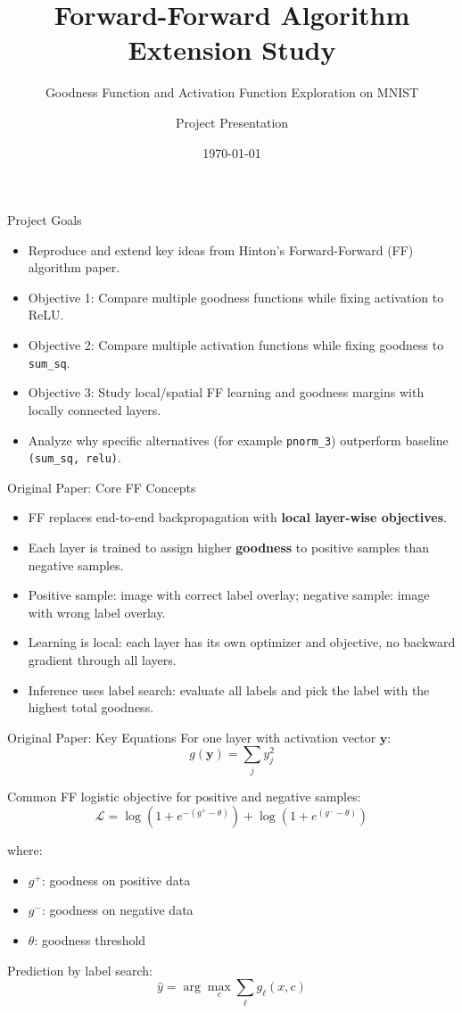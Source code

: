 \documentclass[aspectratio=169]{beamer}
\title{Forward-Forward Algorithm Extension Study}
\subtitle{Goodness Function and Activation Function Exploration on MNIST}
\author{Project Presentation}
\date{\today}
\begin{document}
\begin{frame}
  \titlepage
\end{frame}

\begin{frame}{Project Goals}
\begin{itemize}
  \item Reproduce and extend key ideas from Hinton's Forward-Forward (FF) algorithm paper.
  \item Objective 1: Compare multiple goodness functions while fixing activation to ReLU.
  \item Objective 2: Compare multiple activation functions while fixing goodness to \texttt{sum\_sq}.
  \item Objective 3: Study local/spatial FF learning and goodness margins with locally connected layers.
  \item Analyze why specific alternatives (for example \texttt{pnorm\_3}) outperform baseline \texttt{(sum\_sq, relu)}.
\end{itemize}
\end{frame}

\begin{frame}{Original Paper: Core FF Concepts}
\begin{itemize}
  \item FF replaces end-to-end backpropagation with \textbf{local layer-wise objectives}.
  \item Each layer is trained to assign higher \textbf{goodness} to positive samples than negative samples.
  \item Positive sample: image with correct label overlay; negative sample: image with wrong label overlay.
  \item Learning is local: each layer has its own optimizer and objective, no backward gradient through all layers.
  \item Inference uses label search: evaluate all labels and pick the label with the highest total goodness.
\end{itemize}
\end{frame}

\begin{frame}{Original Paper: Key Equations}
For one layer with activation vector \(\mathbf{y}\):
\[
g(\mathbf{y}) = \sum_j y_j^2
\]

Common FF logistic objective for positive and negative samples:
\[
\mathcal{L} = \log\left(1+e^{-(g^+ - \theta)}\right) + \log\left(1+e^{(g^- - \theta)}\right)
\]

where:
\begin{itemize}
  \item \(g^+\): goodness on positive data
  \item \(g^-\): goodness on negative data
  \item \(\theta\): goodness threshold
\end{itemize}

Prediction by label search:
\[
\hat{y} = \arg\max_c \sum_{\ell} g_{\ell}(x, c)
\]
\end{frame}
\end{document}
